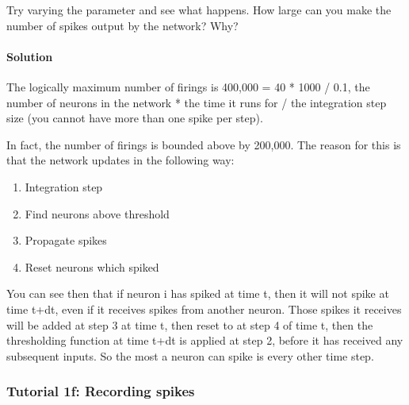 \documentclass[letterpaper,10pt]{manual}
\begin{document}
Try varying the parameter  and see what happens. How large
can you make the number of spikes output by the network? Why?


\paragraph{Solution}

The logically maximum number of firings is
400,000 = 40 * 1000 / 0.1, the number of neurons in the
network * the time it runs for / the integration step size (you
cannot have more than one spike per step).

In fact, the number of firings is bounded above by 200,000. The
reason for this is that the network updates in the following way:
\begin{enumerate}
\item {} 
Integration step

\item {} 
Find neurons above threshold

\item {} 
Propagate spikes

\item {} 
Reset neurons which spiked

\end{enumerate}

You can see then that if neuron i has spiked at time t, then it
will not spike at time t+dt, even if it receives spikes from
another neuron. Those spikes it receives will be added at step
3 at time t, then reset to  at step 4 of time t, then the
thresholding function at time t+dt is applied at step 2, before
it has received any subsequent inputs. So the most a neuron
can spike is every other time step.

\resetcurrentobjects


\subsubsection{Tutorial 1f: Recording spikes}
\end{document}

